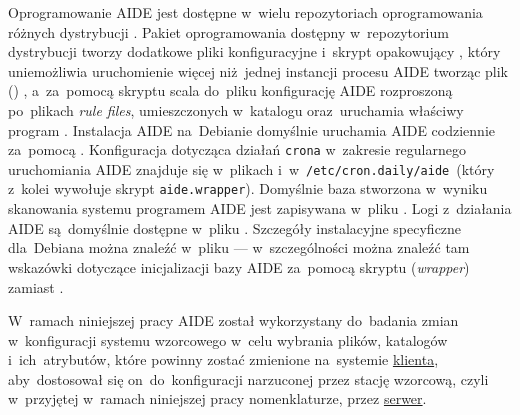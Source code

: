 \documentclass[thesis]{subfiles}
\begin{document}
Oprogramowanie AIDE jest dostępne w~wielu repozytoriach oprogramowania różnych dystrybucji . Pakiet oprogramowania dostępny w~repozytorium dystrybucji \debian{} tworzy dodatkowe pliki konfiguracyjne i~skrypt opakowujący , który uniemożliwia uruchomienie więcej niż~jednej instancji procesu AIDE tworząc plik () , a~za~pomocą skryptu  scala do~pliku  konfigurację AIDE rozproszoną po~plikach \emph{rule files}, umieszczonych w~katalogu  oraz~uruchamia właściwy program . Instalacja AIDE na~Debianie domyślnie uruchamia AIDE codziennie za~pomocą . Konfiguracja dotycząca działań \texttt{crona} w~zakresie regularnego uruchomiania AIDE znajduje się w~plikach  i~w~\texttt{/etc/cron.daily/aide}~(który z~kolei wywołuje skrypt \texttt{aide.wrapper}). Domyślnie baza stworzona w~wyniku skanowania systemu programem AIDE jest zapisywana w~pliku . Logi z~działania AIDE są~domyślnie dostępne w~pliku . Szczegóły instalacyjne specyficzne dla~Debiana można znaleźć w~pliku  --- w~szczególności można znaleźć tam wskazówki dotyczące inicjalizacji bazy AIDE za~pomocą skryptu  (\emph{wrapper}) zamiast .

W~ramach niniejszej pracy AIDE został wykorzystany do~badania zmian w~konfiguracji systemu wzorcowego w~celu wybrania plików, katalogów i~ich~atrybutów, które powinny zostać zmienione na~systemie \hyperref[sec:cli-app]{klienta}, aby~dostosował się on~do~konfiguracji narzuconej przez stację wzorcową, czyli w~przyjętej w~ramach niniejszej pracy nomenklaturze, przez \hyperref[sec:srv-app]{serwer}.
\end{document}
